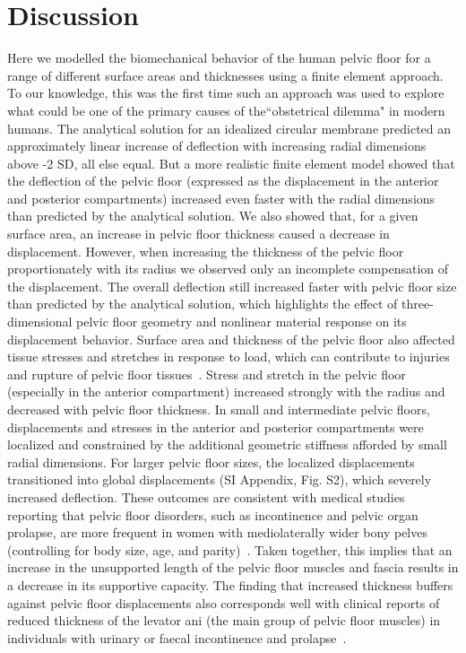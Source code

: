 \documentclass[9pt,twocolumn,twoside]{pnas-new}
\begin{document}
\section*{Discussion}
Here we modelled the biomechanical behavior of the human pelvic floor for a range of different surface areas and thicknesses using a finite element approach. To our knowledge, this was the first time such an approach was used to explore what could be one of the primary causes of the``obstetrical dilemma" in modern humans. The analytical solution for an idealized circular membrane predicted an approximately linear increase of deflection with increasing radial dimensions above -2 SD, all else equal. But a more realistic finite element model showed that the deflection of the pelvic floor (expressed as the displacement in the anterior and posterior compartments) increased even faster with the radial dimensions than predicted by the analytical solution. We also showed that, for a given surface area, an increase in pelvic floor thickness caused a decrease in displacement. However, when increasing the thickness of the pelvic floor proportionately with its radius we observed only an incomplete compensation of the displacement. The overall deflection still increased faster with pelvic floor size than predicted by the analytical solution, which highlights the effect of three-dimensional pelvic floor geometry and nonlinear material response on its displacement behavior.
Surface area and thickness of the pelvic floor also affected tissue stresses and stretches in response to load, which can contribute to injuries and rupture of pelvic floor tissues~\cite{Humphrey2003-rb,Willis2002-eo}. Stress and stretch in the pelvic floor (especially in the anterior compartment) increased strongly with the radius and decreased with pelvic floor thickness. In small and intermediate pelvic floors, displacements and stresses in the anterior and posterior compartments were localized and constrained by the additional geometric stiffness afforded by small radial dimensions. For larger pelvic floor sizes, the localized displacements transitioned into global displacements (SI Appendix, Fig. S2), which severely increased deflection.
These outcomes are consistent with medical studies reporting that pelvic floor disorders, such as incontinence and pelvic organ prolapse, are more frequent in women with mediolaterally wider bony pelves (controlling for body size, age, and parity)~\cite{Brown2013-pi,Abitbol1988-ir,Sze1999-tb}. Taken together, this implies that an increase in the unsupported length of the pelvic floor muscles and fascia results in a decrease in its supportive capacity. The finding that increased thickness buffers against pelvic floor displacements also corresponds well with clinical reports of reduced thickness of the levator ani (the main group of pelvic floor muscles) in individuals with urinary or faecal incontinence and prolapse~\cite{Handa2009-ri,Schawkat2018-et,Wijma2007-hh}. 
\end{document}
